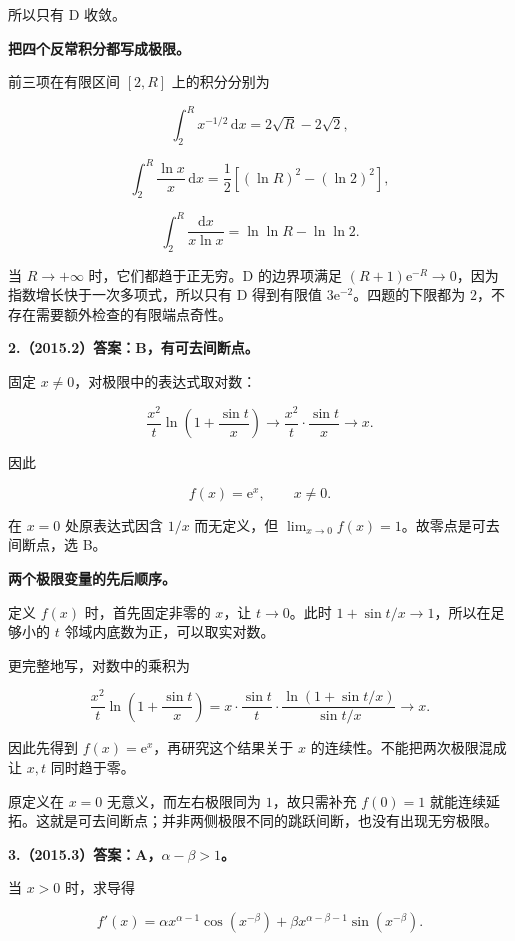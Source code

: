 \documentclass[UTF8,11pt,fontset=windows]{ctexart}
\begin{document}
所以只有 D 收敛。

\textbf{把四个反常积分都写成极限。}

前三项在有限区间 $[2,R]$ 上的积分分别为

$$
\int_2^R x^{-1/2}\,\mathrm dx=2\sqrt R-2\sqrt2,
$$

$$
\int_2^R\frac{\ln x}{x}\,\mathrm dx
=\frac12[(\ln R)^2-(\ln2)^2],
$$

$$
\int_2^R\frac{\mathrm dx}{x\ln x}
=\ln\ln R-\ln\ln2.
$$

当 $R\to+\infty$ 时，它们都趋于正无穷。D 的边界项满足 $(R+1)\mathrm e^{-R}\to0$，因为指数增长快于一次多项式，所以只有 D 得到有限值 $3\mathrm e^{-2}$。四题的下限都为 $2$，不存在需要额外检查的有限端点奇性。

\clearpage

\textbf{2.（2015.2）答案：B，有可去间断点。}

固定 $x\ne0$，对极限中的表达式取对数：

$$
\frac{x^2}{t}\ln\left(1+\frac{\sin t}{x}\right)
\longrightarrow\frac{x^2}{t}\cdot\frac{\sin t}{x}
\longrightarrow x.
$$

因此

$$
f(x)=\mathrm e^x,\qquad x\ne0.
$$

在 $x=0$ 处原表达式因含 $1/x$ 而无定义，但 $\lim_{x\to0}f(x)=1$。故零点是可去间断点，选 B。

\textbf{两个极限变量的先后顺序。}

定义 $f(x)$ 时，首先固定非零的 $x$，让 $t\to0$。此时 $1+\sin t/x\to1$，所以在足够小的 $t$ 邻域内底数为正，可以取实对数。

更完整地写，对数中的乘积为

$$
\frac{x^2}{t}\ln\left(1+\frac{\sin t}{x}\right)
=x\cdot\frac{\sin t}{t}\cdot
\frac{\ln(1+\sin t/x)}{\sin t/x}\longrightarrow x.
$$

因此先得到 $f(x)=\mathrm e^x$，再研究这个结果关于 $x$ 的连续性。不能把两次极限混成让 $x,t$ 同时趋于零。

原定义在 $x=0$ 无意义，而左右极限同为 $1$，故只需补充 $f(0)=1$ 就能连续延拓。这就是可去间断点；并非两侧极限不同的跳跃间断，也没有出现无穷极限。

\clearpage

\textbf{3.（2015.3）答案：A，$\alpha-\beta>1$。}

当 $x>0$ 时，求导得

$$
f'(x)=\alpha x^{\alpha-1}\cos(x^{-\beta})
+\beta x^{\alpha-\beta-1}\sin(x^{-\beta}).
$$
\end{document}
